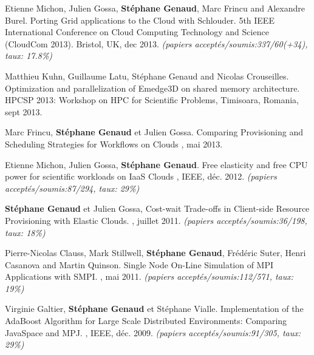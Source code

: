\documentclass[11pt]{article}
\begin{document}
\begin{thebibliography}{99}
Etienne Michon, Julien Gossa, \textbf{Stéphane Genaud}, Marc Frincu and Alexandre Burel.
\newblock Porting Grid applications to the Cloud with Schlouder.
\newblock 5th IEEE International Conference on Cloud Computing Technology and Science (CloudCom 2013). Bristol, UK, dec 2013.
\newblock \small{\textit{(papiers acceptés/soumis{:}337/60(+34), taux: 17.8\%)}}

Matthieu Kuhn, Guillaume Latu, Stéphane Genaud and Nicolas Crouseilles.
\newblock Optimization and parallelization of Emedge3D on shared memory architecture.
\newblock HPCSP 2013: Workshop on HPC for Scientific Problems, Timisoara, Romania, sept 2013.


Marc Frincu, \textbf{Stéphane Genaud} et Julien Gossa.
\newblock Comparing Provisioning and Scheduling Strategies for Workflows on Clouds
, mai 2013.

Etienne Michon, Julien Gossa, \textbf{Stéphane Genaud}.
\newblock Free elasticity and free CPU power for scientific workloads on IaaS Clouds
, 
IEEE, déc. 2012.
\newblock \small{\textit{(papiers acceptés/soumis:87/294, taux: 29\%)}}


\newblock \textbf{Stéphane Genaud} et Julien Gossa,
\newblock Cost-wait Trade-offs in Client-side Resource Provisioning with 
Elastic Clouds.
, juillet 2011.
\newblock \small{\textit{(papiers acceptés/soumis{:}36/198, taux: 18\%)}}


\newblock Pierre-Nicolas Clauss, Mark Stillwell, \textbf{Stéphane Genaud}, 
Fr\'ed\'eric Suter, Henri Casanova and  Martin Quinson.
\newblock Single Node On-Line Simulation of MPI Applications with SMPI.
, mai 2011.
\newblock \small{\textit{(papiers acceptés/soumis{:}112/571, taux: 19\%)}}

\newblock Virginie Galtier, \textbf{Stéphane Genaud} et Stéphane Vialle.
\newblock Implementation of the AdaBoost Algorithm for Large Scale Distributed 
Environments: Comparing JavaSpace and MPJ.
, 
IEEE, déc. 2009.
\newblock \small{\textit{(papiers acceptés/soumis:91/305, taux: 29\%)}}



\end{thebibliography}
\end{document}
